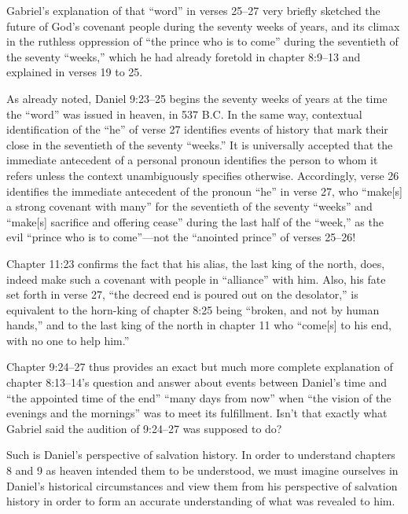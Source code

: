 Gabriel's explanation of that ``word'' in verses 25--27 very briefly sketched
the future of God's covenant people during the seventy weeks of years, and
its climax in the ruthless oppression of ``the prince who is to come'' during
the seventieth of the seventy ``weeks,'' which he had already foretold in
chapter 8:9--13 and explained in verses 19 to 
25.

As already noted, Daniel 9:23--25 begins the seventy weeks of years at the
time the ``word'' was issued in heaven, in 537 B.C. In the same way,
contextual identification of the ``he'' of verse 27 identifies events of
history that mark their close in the seventieth of the seventy ``weeks.'' It
is universally accepted that the immediate antecedent of a personal pronoun
identifies the person to whom it refers unless the context unambiguously
specifies otherwise. Accordingly, verse 26 identifies the immediate
antecedent of the pronoun ``he'' in verse 27, who ``make[s] a strong covenant
with many'' for the seventieth of the seventy ``weeks'' and ``make[s] sacrifice
and offering cease'' during the last half of the ``week,'' as the evil ``prince
who is to come''---not the ``anointed prince'' of verses 25--26! 

Chapter 11:23 confirms the fact that his alias, the last king of the north,
does, indeed make such a covenant with people in ``alliance'' with him. Also,
his fate set forth in verse 27, ``the decreed end is poured out on the
desolator,'' is equivalent to the horn-king of chapter 8:25 being ``broken,
and not by human hands,'' and to the last king of the north in chapter 11 who
``come[s] to his end, with no one to help him.'' 

Chapter 9:24--27 thus provides an exact but much more complete explanation of
chapter 8:13--14's question and answer about events between Daniel's time and
``the appointed time of the end'' ``many days from now'' when ``the vision of the
evenings and the mornings'' was to meet its 
fulfillment. Isn't that exactly
what Gabriel said the audition of 9:24--27 was supposed to 
do? 

Such is Daniel's perspective of salvation history. In order to understand
chapters 8 and 9 as heaven intended them to be understood, we must imagine
ourselves in Daniel's historical circumstances and view them from his
perspective of salvation history in order to form an accurate understanding
of what was revealed to him.

